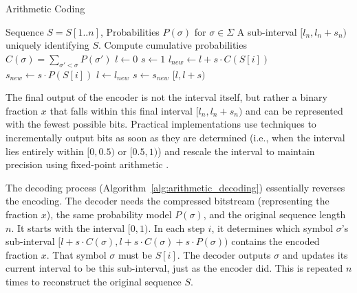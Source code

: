 \begin{algorithm}[hbtp] %
    \caption{Arithmetic Coding} \label{alg:arithmetic_coding}
    \small
    \begin{algorithmic}[1] %
        \Require Sequence $S=S[1..n]$, Probabilities $P(\sigma)$ for $\sigma \in \Sigma$
        \Ensure A sub-interval $[l_n, l_n+s_n)$ uniquely identifying $S$.
        \State Compute cumulative probabilities $C(\sigma) = \sum_{\sigma' < \sigma} P(\sigma')$
        \State $l \gets 0$
        \State $s \gets 1$ \Comment{Initial interval [0, 1), size 1}
        \State $l_{new} \gets l + s \cdot C(S[i])$ 
        \State $s_{new} \gets s \cdot P(S[i])$ 
        \State $l \gets l_{new}$
        \State $s \gets s_{new}$
        \EndFor
        \State \Return $[l, l+s)$ 
    \end{algorithmic}
\end{algorithm}

The final output of the encoder is not the interval itself, but rather a binary fraction $x$ that falls within this final interval $[l_n, l_n + s_n)$ and can be represented with the fewest possible bits. Practical implementations use techniques to incrementally output bits as soon as they are determined (i.e., when the interval lies entirely within $[0, 0.5)$ or $[0.5, 1)$) and rescale the interval to maintain precision using fixed-point arithmetic \cite{moffat1998arithmetic, ferragina2023pearls}.

The decoding process (Algorithm~\ref{alg:arithmetic_decoding}) essentially reverses the encoding. The decoder needs the compressed bitstream (representing the fraction $x$), the same probability model $P(\sigma)$, and the original sequence length $n$. It starts with the interval $[0, 1)$. In each step $i$, it determines which symbol $\sigma$'s sub-interval $[l + s \cdot C(\sigma), l + s \cdot C(\sigma) + s \cdot P(\sigma))$ contains the encoded fraction $x$. That symbol $\sigma$ must be $S[i]$. The decoder outputs $\sigma$ and updates its current interval to be this sub-interval, just as the encoder did. This is repeated $n$ times to reconstruct the original sequence $S$.

